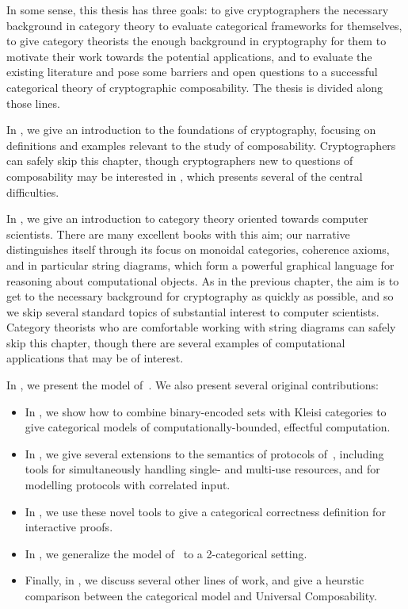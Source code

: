 In some sense, this thesis has three goals: to give cryptographers the necessary
background in category theory to evaluate categorical frameworks for themselves,
to give category theorists the enough background in cryptography for them to
motivate their work towards the potential applications, and to evaluate the
existing literature and pose some barriers and open questions to a successful
categorical theory of cryptographic composability. The thesis is divided along
those lines.

In , we give an introduction
to the foundations of cryptography, focusing on definitions and examples
relevant to the study of composability. Cryptographers can safely skip this
chapter, though cryptographers new to questions of composability may be
interested in , which
presents several of the central difficulties.

In , we give an
introduction to category theory oriented towards computer scientists. There are
many excellent books with this aim; our narrative distinguishes itself through
its focus on monoidal categories, coherence axioms, and in particular string
diagrams, which form a powerful graphical language for reasoning about
computational objects. As in the previous chapter, the aim is to get to the
necessary background for cryptography as quickly as possible, and so we skip
several standard topics of substantial interest to computer scientists. Category
theorists who are comfortable working with string diagrams can safely skip this
chapter, though there are several examples of computational applications that
may be of interest.

In ,
we present the model of~\cite{broadbent-karvonen-2022}. We also present several
original contributions: \begin{itemize}
  \item In
    ,
    we show how to combine binary-encoded sets with Kleisi categories to give
    categorical models of computationally-bounded, effectful computation.
  \item In ,
    we give several extensions to the semantics of protocols
    of~\cite{broadbent-karvonen-2022}, including tools for simultaneously handling
    single- and multi-use resources, and for modelling protocols with correlated
    input.
  \item In ,
    we use these novel tools to give a categorical correctness definition for
    interactive proofs.
  \item In ,
    we generalize the model of~\cite{broadbent-karvonen-2022} to a 2-categorical
    setting.
  \item Finally, in , we discuss
    several other lines of work, and give a heurstic comparison between the
    categorical model and Universal Composability.
\end{itemize}
